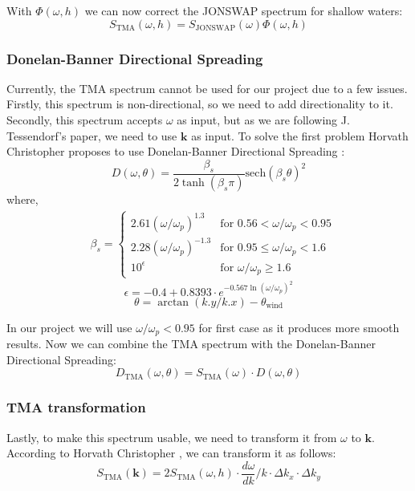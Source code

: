 With $\Phi(\omega, h)$ we can now correct the JONSWAP spectrum for shallow waters:
\begin{equation}
    S_{\text{TMA}}(\omega, h) = S_{\text{JONSWAP}}(\omega) \Phi(\omega, h)
    \label{eq:tma_spectrum}
\end{equation}

\subsubsection{Donelan-Banner Directional Spreading}
Currently, the TMA spectrum cannot be used for our project due to a few issues. Firstly, this spectrum is non-directional, so we need to add directionality to it. Secondly, this spectrum accepts $\omega$ as input, but as we are following J. Tessendorf's \cite{tessendorf2001} paper, we need to use $\mathbf{k}$ as input.
To solve the first problem Horvath Christopher \cite{horvath2015} proposes to use Donelan-Banner Directional Spreading \cite{young1999}:
\begin{equation}
    D(\omega, \theta) = \frac{\beta_s}{2 \tanh(\beta_s\pi)}\text{sech}(\beta_s\theta)^{2}
\end{equation}
where,
$$
\begin{aligned}
    &\beta_s =
    \begin{cases} 
    2.61(\omega/\omega_p)^{1.3} & \text{for } 0.56 < \omega/\omega_p < 0.95 \\
    2.28(\omega/\omega_p)^{-1.3} & \text{for } 0.95 \leq \omega/\omega_p < 1.6 \\
    10^{\epsilon} & \text{for } \omega/\omega_p \geq 1.6
    \end{cases}
\end{aligned}
$$
$$
\epsilon = -0.4 + 0.8393 \cdot e^{-0.567\ln(\omega/\omega_p)^{2}}
$$
$$
\theta = \arctan(k.y / k.x) - \theta_{\text{wind}}
$$

In our project we will use $\omega/\omega_p < 0.95$ for first case as it produces more smooth results.
Now we can combine the TMA spectrum with the Donelan-Banner Directional Spreading:
\begin{equation}
    D_{\text{TMA}}(\omega, \theta) = S_{\text{TMA}}(\omega) \cdot D(\omega, \theta)
\end{equation}

\subsubsection{TMA transformation}
Lastly, to make this spectrum usable, we need to transform it from $\omega$ to $\mathbf{k}$. According to Horvath Christopher \cite{horvath2015}, we can transform it as follows:
\begin{equation}
    S_{\text{TMA}}(\mathbf{k}) = 2S_{\text{TMA}}(\omega, h) \cdot \frac{d\omega}{dk} / k \cdot \Delta k_x \cdot \Delta k_y
    \label{eq:tma_spectrum_k}
\end{equation}


